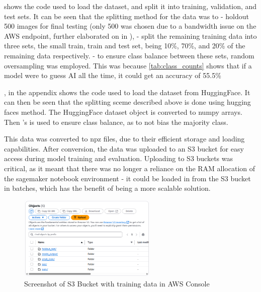  shows the code used to load the dataset, and split it into training, validation, and test sets. It can be seen that the splitting method for the data was to 
- holdout 500 images for final testing (only 500 was chosen due to a bandwidth issue on the AWS endpoint, further elaborated on in ),
- split the remaining training data into three sets, the small train, train and test set, being 10\%, 70\%, and 20\% of the remaining data respectively.
- to ensure class balance between these sets, random oversampling was employed. This was because \cref{tab:class_counts} shows that if a model were to guess AI all the time, it could get an accuracy of 55.5\%

, in the appendix shows the code used to load the dataset from HuggingFace. It can then be seen that the splitting sceme described above is done using hugging faces  method. The HuggingFace dataset object is converted to numpy arrays. Then 's  is used to ensure class balance, as to not bias the majority class.



This data was converted to npz files, due to their efficient storage and loading capabilities. After conversion, the data was uploaded to an S3 bucket for easy access during model training and evaluation. Uploading to S3 buckets was critical, as it meant that there was no longer a reliance on the RAM allocation of the sagemaker notebook environment - it could be loaded in from the S3 bucket in batches, which has the benefit of being a more scalable solution.

\begin{figure}[h]
    \centering
    \includegraphics[width=250px]{figures/s3_bucket_screenshot.png} %
    \centering
    \caption{Screenshot of S3 Bucket with training data in AWS Console} %
    \label{fig:s3_bucket} %
\end{figure}


